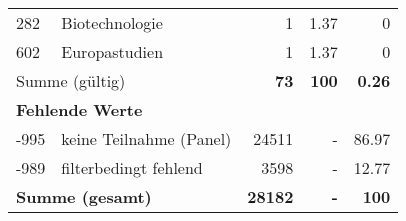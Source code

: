 \begin{longtable}{lXrrr}
        282 & \multicolumn{1}{X}{Biotechnologie} & %
          \num{1} &
          \num[round-mode=places,round-precision=2]{1,37} &
          \num[round-mode=places,round-precision=2]{0} \\

        602 & \multicolumn{1}{X}{Europastudien} & %
          \num{1} &
          \num[round-mode=places,round-precision=2]{1,37} &
          \num[round-mode=places,round-precision=2]{0} \\

     \midrule
     \multicolumn{2}{l}{Summe (gültig)} &
       \textbf{\num{73}} &
     \textbf{100} &
       \textbf{\num[round-mode=places,round-precision=2]{0,26}} \\
     \multicolumn{5}{l}{\textbf{Fehlende Werte}}\\
       -995 &
       keine Teilnahme (Panel) &
         \num{24511} &
        - &
         \num[round-mode=places,round-precision=2]{86,97} \\
       -989 &
       filterbedingt fehlend &
         \num{3598} &
        - &
         \num[round-mode=places,round-precision=2]{12,77} \\
     \midrule
     \multicolumn{2}{l}{\textbf{Summe (gesamt)}} &
          \textbf{\num{28182}} &
        \textbf{-} &
        \textbf{100} \\
     \bottomrule
     \end{longtable}
     
